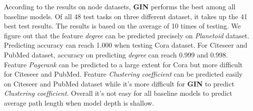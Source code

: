 \documentclass[sigconf]{acmart}
\begin{document}
According to the results on node datasets,
\textbf{GIN} performs the best among all baseline models. Of all 48 test tasks on three different dataset,
it takes up the 41 best test results. The results is based on the average of 10 times of testing.
We figure out that the feature \textit{degree} can be predicted precisely on \textit{Planetoid} dataset.
Predicting accuracy can reach 1.000 when testing {\sc Cora} dataset. For {\sc Citeseer} and {\sc PubMed} dataset,
accuracy on predicting \textit{degree} can reach 0.999 and 0.998. Feature \textit{Pagerank} can be predicted to a large extent for 
{\sc Cora} but more difficult for {\sc Citeseer} and {\sc PubMed}. Feature \textit{Clustering coefficient} can be predicted easily on
{\sc Citeseer} and {\sc PubMed} dataset while it's more difficult for \textbf{GIN} to predict \textit{Clustering coefficient}.
Overall it's not easy for all baseline models to predict average path length when model depth is shallow.
\end{document}
